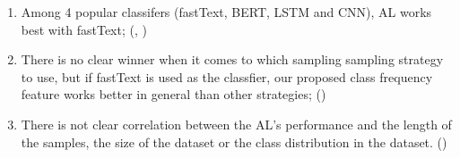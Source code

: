 \begin{enumerate}
\item Among 4 popular classifers (fastText, BERT, LSTM and CNN), AL works best with fastText; (, )
\item There is no clear winner when it comes to which sampling sampling
strategy to use, but if fastText is used as the classfier, our proposed
class frequency feature works better in general than other strategies; ()
\item There is not clear correlation between the AL's performance and the
length of the samples, the size of the dataset or the class distribution
in the dataset. ()
\end{enumerate}

%
%

